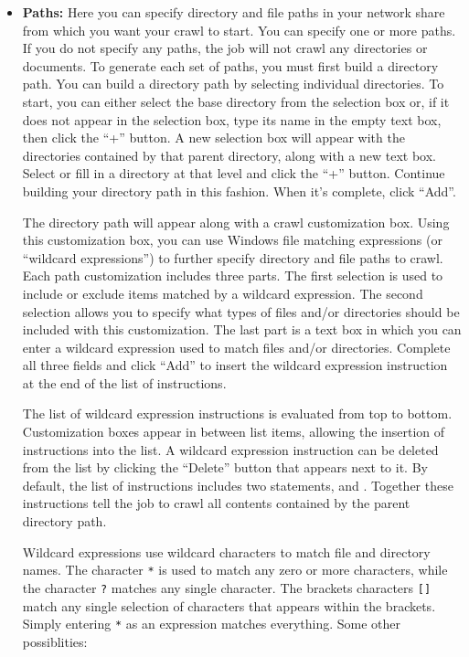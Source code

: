 \begin{itemize}

\item \textbf{Paths:} Here you can specify directory and file paths in
your network share from which you want your crawl to start. You can
specify one or more paths. If you do not specify any paths, the job
will not crawl any directories or documents. To generate each set of
paths, you must first build a directory path. You can build a
directory path by selecting individual directories. To start, you can
either select the base directory from the selection box or, if it does
not appear in the selection box, type its name in the empty text box,
then click the ``+'' button. A new selection box will appear with the
directories contained by that parent directory, along with a new text
box. Select or fill in a directory at that level and click the ``+''
button. Continue building your directory path in this fashion. When
it's complete, click ``Add''.

The directory path will appear along with a crawl customization
box. Using this customization box, you can use Windows file matching
expressions (or ``wildcard expressions'') to further specify directory and
file paths to crawl. Each path customization includes three parts. The
first selection is used to include or exclude items matched by a
wildcard expression. The second selection allows you to specify what
types of files and/or directories should be included with this
customization. The last part is a text box in which you can enter a
wildcard expression used to match files and/or directories. Complete
all three fields and click ``Add'' to insert the wildcard expression
instruction at the end of the list of instructions.

The list of wildcard expression instructions is evaluated from top to
bottom. Customization boxes appear in between list items, allowing the
insertion of instructions into the list. A wildcard expression
instruction can be deleted from the list by clicking the ``Delete''
button that appears next to it. By default, the list of instructions
includes two statements,  and
. Together these
instructions tell the job to crawl all contents contained by the
parent directory path.

Wildcard expressions use wildcard characters to match file and
directory names. The character \texttt{*} is used to match any zero or
more characters, while the character \texttt{?} matches any single
character. The brackets characters \texttt{[]} match any single
selection of characters that appears within the brackets. Simply
entering \texttt{*} as an expression matches everything. Some other
possiblities:


\end{itemize}
